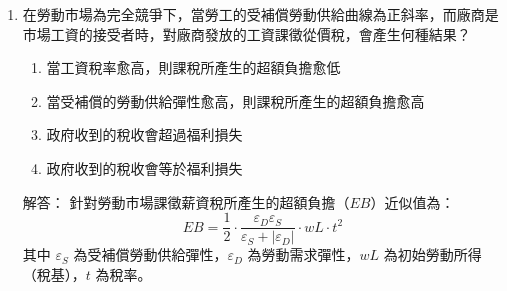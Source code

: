 \documentclass[12pt, a4paper]{article}
\begin{document}
\begin{enumerate}
    \item 在勞動市場為完全競爭下，當勞工的受補償勞動供給曲線為正斜率，而廠商是市場工資的接受者時，對廠商發放的工資課徵從價稅，會產生何種結果？
    \begin{enumerate}[label=\Alph*.]
        \item 當工資稅率愈高，則課稅所產生的超額負擔愈低
        \item 當受補償的勞動供給彈性愈高，則課稅所產生的超額負擔愈高
        \item 政府收到的稅收會超過福利損失
        \item 政府收到的稅收會等於福利損失
    \end{enumerate}
    解答：
    針對勞動市場課徵薪資稅所產生的超額負擔（\(EB\)）近似值為：
    \[
    EB = \frac{1}{2} \cdot \frac{\varepsilon_D \varepsilon_S}{\varepsilon_S + |\varepsilon_D|} \cdot wL \cdot t^2
    \]
    其中 \(\varepsilon_S\) 為受補償勞動供給彈性，\(\varepsilon_D\) 為勞動需求彈性，\(wL\) 為初始勞動所得（稅基），\(t\) 為稅率。

\end{enumerate}
\end{document}
